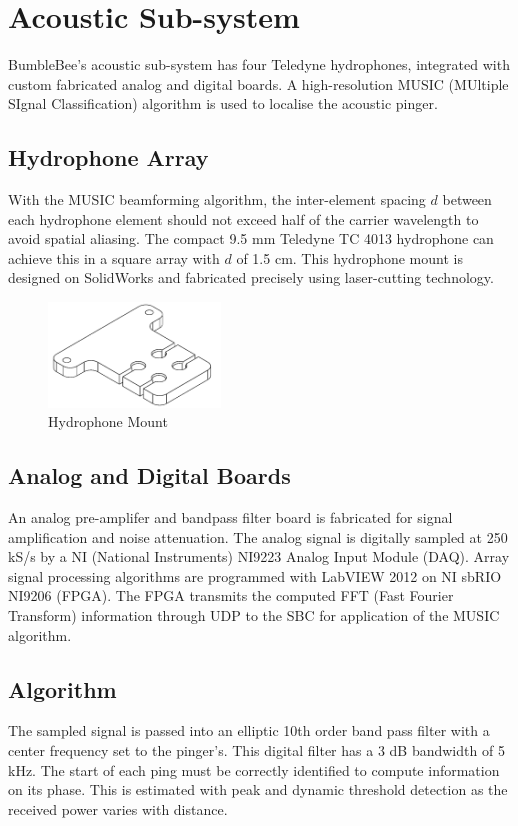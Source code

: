 \documentclass[journal,12pt]{IEEEtran}
\begin{document}
\section{Acoustic Sub-system}
BumbleBee's acoustic sub-system has four Teledyne hydrophones, integrated with custom fabricated analog and digital boards. A high-resolution MUSIC (MUltiple SIgnal Classification) algorithm is used to localise the acoustic pinger. 

\subsection{Hydrophone Array}
With the MUSIC beamforming algorithm, the inter-element spacing $d$ between each hydrophone element should not exceed half of the carrier wavelength to avoid spatial aliasing. The compact 9.5 mm Teledyne TC 4013 hydrophone can achieve this in a square array with $d$ of 1.5 cm. This hydrophone mount is designed on SolidWorks and fabricated precisely using laser-cutting technology.

\begin{figure}[h]
\centering
\includegraphics[width=1.8in]{hydrophonemount.png}
\caption{Hydrophone Mount}
\end{figure}

\subsection{Analog and Digital Boards}
An analog pre-amplifer and bandpass filter board is fabricated for signal amplification and noise attenuation. The analog signal is digitally sampled at 250 kS/s by a NI (National Instruments) NI9223 Analog Input Module (DAQ). Array signal processing algorithms are programmed with LabVIEW 2012 on NI sbRIO NI9206 (FPGA). The FPGA transmits the computed FFT (Fast Fourier Transform) information through UDP to the SBC for application of the MUSIC algorithm.

\subsection{Algorithm}
The sampled signal is passed into an elliptic 10th order band pass filter with a center frequency set to the pinger's. This digital filter has a 3 dB bandwidth of 5 kHz. The start of each ping must be correctly identified to compute information on its phase. This is estimated with peak and dynamic threshold detection as the received power varies with distance. \\
\end{document}
